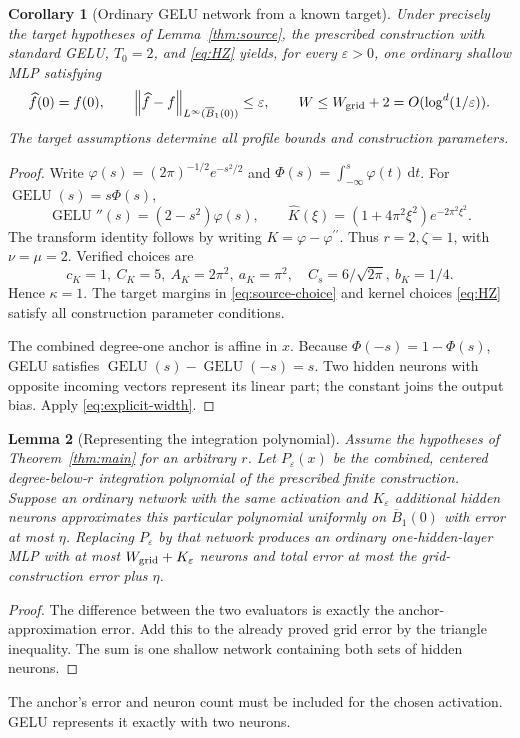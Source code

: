 \documentclass[11pt,letterpaper]{article}
\newcommand{\dd}{\,\mathrm d}
\newcommand{\eps}{\varepsilon}
\newcommand{\norm}[1]{\left\lVert#1\right\rVert}
\newcommand{\Ball}{\overline B_1(0)}
\newcommand{\GELU}{\operatorname{GELU}}
\newtheorem{lemma}{Lemma}[section]
\newtheorem{corollary}[lemma]{Corollary}
\theoremstyle{definition}
\theoremstyle{remark}
\begin{document}
\begin{corollary}[Ordinary GELU network from a known target]\label{cor:gelu}
Under precisely the target hypotheses of Lemma~\ref{thm:source},
the prescribed construction with standard GELU, \(T_0=2\), and
\eqref{eq:HZ} yields, for every \(\eps>0\), one ordinary shallow MLP satisfying
\[
 \widehat f(0)=f(0),\qquad
 \norm{\widehat f-f}_{L^\infty(\Ball)}\le\eps,\qquad
 W\le W_{\rm grid}+2=O(\log^d(1/\eps)).
\]
The target assumptions determine all profile bounds and construction parameters.
\end{corollary}
\begin{proof}
Write \(\varphi(s)=(2\pi)^{-1/2}e^{-s^2/2}\) and
\(\Phi(s)=\int_{-\infty}^s\varphi(t)\dd t\).
For \(\GELU(s)=s\Phi(s)\),
\[
 \GELU''(s)=(2-s^2)\varphi(s),\qquad
 \widehat K(\xi)=(1+4\pi^2\xi^2)e^{-2\pi^2\xi^2}.
\]
The transform identity follows by writing \(K=\varphi-\varphi^{\prime\prime}\).
Thus \(r=2,\zeta=1\), with \(\nu=\mu=2\).
Verified choices are
\[
 c_K=1,\ C_K=5,\ A_K=2\pi^2,\ a_K=\pi^2,\quad
 C_s=6/\sqrt{2\pi},\ b_K=1/4 .
\]
Hence \(\kappa=1\). The target margins in
\eqref{eq:source-choice} and kernel choices \eqref{eq:HZ} satisfy all
construction parameter conditions.

The combined degree-one anchor is affine in \(x\).
Because \(\Phi(-s)=1-\Phi(s)\), GELU satisfies
\(\GELU(s)-\GELU(-s)=s\).
Two hidden neurons with opposite incoming vectors represent its linear part;
the constant joins the output bias. Apply \eqref{eq:explicit-width}.
\end{proof}

\begin{lemma}[Representing the integration polynomial]\label{thm:anchor}
Assume the hypotheses of Theorem~\ref{thm:main} for an arbitrary \(r\).
Let \(P_\eps(x)\) be the combined, centered degree-below-\(r\) integration
polynomial of the prescribed finite construction.
Suppose an ordinary network with the same activation and \(K_\eps\) additional
hidden neurons approximates this particular polynomial uniformly on \(\Ball\)
with error at most \(\eta\).
Replacing \(P_\eps\) by that network produces an ordinary one-hidden-layer MLP
with at most \(W_{\rm grid}+K_\eps\) neurons and total error at most the
grid-construction error plus \(\eta\).
\end{lemma}
\begin{proof}
The difference between the two evaluators is exactly the anchor-approximation
error. Add this to the already proved grid error by the triangle inequality.
The sum is one shallow network containing both sets of hidden neurons.
\end{proof}
The anchor's error and neuron count must be included for the chosen activation.
GELU represents it exactly with two neurons.
\end{document}
